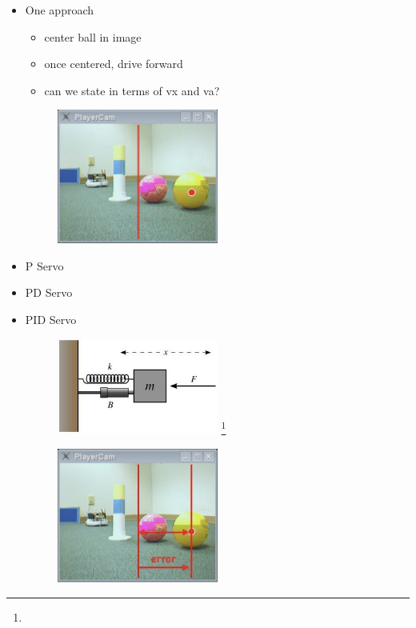 \begin{itemize}
\item One approach
\begin{itemize}
\item center ball in image
\item once centered, drive forward
\item can we state in terms of vx and va?
\end{itemize}

\begin{figure}[!h]
\centering
\includegraphics[width=0.5\textwidth]{figures/6_center_ball.jpg}
\end{figure}

\item P Servo

\item PD Servo

\item PID Servo

\begin{figure}[!h]
\centering
\includegraphics[width=0.5\textwidth]{figures/6_spring_model.jpg}
\footnote{}
\end{figure}

\begin{figure}[!h]
\centering
\includegraphics[width=0.5\textwidth]{figures/6_p_error.jpg}
\end{figure}

\end{itemize}

